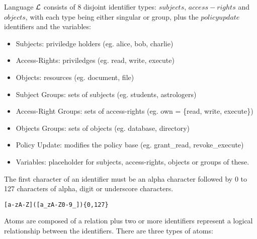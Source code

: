 \documentclass[10pt, twocolumn]{article}
\begin{document}
         Language $\cal{L}$ consists of
        8 disjoint identifier types: $subjects$, $access-rights$ and $objects$,
        with each type being either singular or group, plus the $policy update$
        identifiers and the variables:

        \begin{itemize}
          \item
            Subjects: priviledge holders (eg. alice, bob, charlie)
          \item
            Access-Rights: priviledges (eg. read, write, execute)
          \item
            Objects: resources (eg. document, file)
          \item
            Subject Groups: sets of subjects (eg. students, astrologers)
          \item
            Access-Right Groups: sets of access-rights (eg. own = \{read,
            write, execute\})
          \item
            Objects Groups: sets of objects (eg. database, directory)
          \item
            Policy Update: modifies the policy base (eg. grant\_read,
            revoke\_execute)
          \item
            Variables: placeholder for subjects, access-rights, objects
            or groups of these.
        \end{itemize}

        The first character of an identifier must be an alpha character
        followed by 0 to 127 characters of alpha, digit or underscore
        characters.

        \begin{verbatim}[a-zA-Z]([a_zA-Z0-9_]){0,127}\end{verbatim}

         Atoms are composed of a relation plus two or
        more identifiers represent a logical relationship between the
        identifiers. There are three types of atoms:
\end{document}
